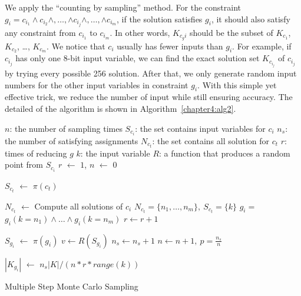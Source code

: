 We apply the ``counting by sampling'' method. For
the constraint $g_{i}= c_{i_1} \land c_{i_2} \land ,\ldots, \land c_{i_j} \land ,\ldots, \land c_{i_m}$, if the solution satisfies $g_{i}$, it should also
satisfy any constraint from $c_{i_1}$ to $c_{i_m}$. In other words, $K_{c_gi}$
should be the subset of $K_{c_1}$, $K_{c_2}$, \ldots , $K_{c_m}$. We notice that
$c_i$ usually has fewer inputs than $g_{i}$. For example, if
$c_{i_j}$ has only one 8-bit input variable, we can find the exact solution set
$K_{c_{i_j}}$ of $c_{i_j}$ by trying every possible 256 solution. After that,
we only generate random input numbers for the other input variables in
constraint $g_{i}$. With this simple yet effective trick, we reduce the number of input while still ensuring accuracy. The detailed of the algorithm is shown in Algorithm~\ref{chapter4:alg2}.


\IncMargin{1em}
\begin{algorithm}\small
    \SetAlgoLined
    \DontPrintSemicolon


    $n$: the number of sampling times \;
    $S_{c_i}$: the set contains input variables for $c_{i}$ \;
    $n_{s}$: the number of satisfying assignments \;
    $N_{c_t}$: the set contains all solution for $c_t$ \;
    $r$: times of reducing $g$\;
    $k$: the input variable \;
    $R$: a function that produces a random point from $S_{c_i}$\;
    $r$ $\leftarrow$ $1$,
    $n$ $\leftarrow$ $0$ \;
     {
    $S_{c_t}$ $\leftarrow$ $\pi(c_t)$ \;
    {
    $N_{c_t}$ $\leftarrow$ Compute all solutions of $c_i$ \;
    $N_{c_t} = \{n_1, \ldots, n_m\},\ S_{c_t} = \{k\}  $ \;
    $g_{i} = $ $g_i(k=n_1) \land \ldots \land g_i(k=n_m)$ \;
    $r \leftarrow r+1$ \;

    }
    }
     {
        $S_{g_i}$ $\leftarrow$ $\pi(g_i)$ \;
        $v \leftarrow R(S_{g_i})$
        {
            $n_s \leftarrow n_s + 1$
        }
        $n \leftarrow n +1,\ p = \frac{n_s}{n}$
    }

    $|K_{g_{i}}|$ $\leftarrow$ $n_s|K| / (n * r * range(k))$
    \caption{Multiple Step Monte Carlo Sampling}\label{chapter4:alg2}
\end{algorithm}
\DecMargin{1em}

